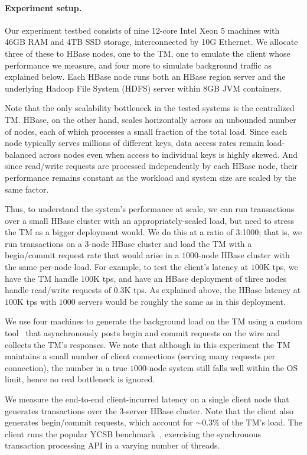 \paragraph{Experiment setup.}

Our experiment testbed consists of nine 12-core Intel Xeon 5 machines with 46GB RAM and 4TB 
SSD storage, interconnected by 10G Ethernet. We allocate three of these to HBase nodes, 
one to the TM, one to emulate the client whose performance we measure, and four more to simulate 
background traffic as explained below. Each HBase node runs both an HBase region server and 
the underlying Hadoop File System (HDFS) server within 8GB JVM containers. 

Note that the only scalability bottleneck in the tested systems is the centralized TM.
HBase, on the other hand, scales horizontally across an unbounded number of nodes, each of which processes a small fraction of the total load. 
Since each node typically serves millions of different keys, data access rates remain load-balanced across nodes 
even when access to individual keys is highly skewed.  And since read/write requests are processed independently by each HBase node, 
their performance remains constant as the workload and  system size are scaled by the same factor. 

Thus, to understand the system's performance at scale, 
we can run transactions over a small HBase cluster with an appropriately-scaled load, 
but need to stress the TM as a bigger deployment would. 
We do this at a ratio of 3:1000; that is, we run transactions on a $3$-node HBase cluster and 
load the TM with a begin/commit request rate that would arise in a $1000$-node HBase cluster with the same per-node load.
For example, to test the client's latency at $100$K tps, we have the TM handle $100$K tps, and have  an HBase deployment of
three nodes handle read/write requests of $0.3$K tps. As explained above, 
the HBase latency at $100$K tps with $1000$ servers would be roughly the same as in this deployment.

We use four machines to generate the background load on the TM using a custom tool~\cite{Omid2017} 
that asynchronously posts begin and commit requests on the wire and collects the TM's responses. 
We note that although in this experiment the TM maintains a small number of client connections (serving many requests per connection), 
the number in a true $1000$-node system still falls well within the OS limit, hence no real bottleneck is ignored. 

We measure the end-to-end client-incurred latency on a single client node that generates transactions over the $3$-server HBase cluster. 
Note that the client also generates begin/commit requests, which account for \mbox{$\sim0.3\%$} of the TM's load.
The client runs the popular YCSB benchmark~\cite{Cooper:2010:BCS:1807128.1807152}, 
exercising the synchronous transaction processing API in a varying number of threads. 

